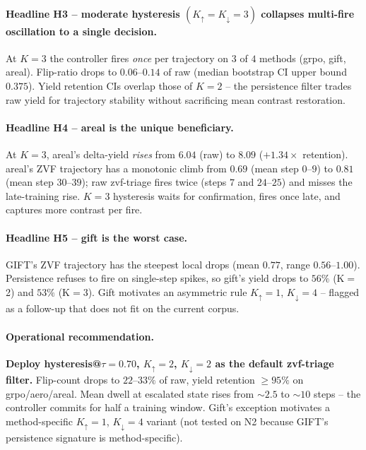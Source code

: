 \documentclass{article}
\begin{document}
\paragraph{Headline H3 -- moderate hysteresis
              $(K_{\uparrow}{=}K_{\downarrow}{=}3)$ collapses
              multi-fire oscillation to a single decision.}
At $K = 3$ the controller fires \emph{once} per trajectory on
$3$ of $4$ methods (grpo, gift, areal).  Flip-ratio drops to
$0.06$--$0.14$ of raw (median bootstrap CI upper bound $0.375$).
Yield retention CIs overlap those of $K = 2$ -- the persistence
filter trades raw yield for trajectory stability without
sacrificing mean contrast restoration.

\paragraph{Headline H4 -- areal is the unique beneficiary.}
At $K = 3$, areal's delta-yield \emph{rises} from $6.04$
(raw) to $8.09$ ($+1.34\times$ retention).  areal's ZVF
trajectory has a monotonic climb from $0.69$ (mean step $0$--$9$)
to $0.81$ (mean step $30$--$39$); raw zvf-triage fires twice
(steps $7$ and $24$--$25$) and misses the late-training rise.
$K = 3$ hysteresis waits for confirmation, fires once late,
and captures more contrast per fire.

\paragraph{Headline H5 -- gift is the worst case.}
GIFT's ZVF trajectory has the steepest local drops (mean $0.77$,
range $0.56$--$1.00$).  Persistence refuses to fire on
single-step spikes, so gift's yield drops to $56\%$ (K$=$2)
and $53\%$ (K$=$3).  Gift motivates an asymmetric rule
$K_{\uparrow}{=}1$, $K_{\downarrow}{=}4$ -- flagged as a
follow-up that does not fit on the current corpus.

\paragraph{Operational recommendation.}
\textbf{Deploy hysteresis@$\tau = 0.70$, $K_{\uparrow} = 2$,
$K_{\downarrow} = 2$ as the default zvf-triage filter.}
Flip-count drops to $22$--$33\%$ of raw, yield retention $\ge 95\%$
on grpo/aero/areal.  Mean dwell at escalated state rises from
$\sim 2.5$ to $\sim 10$ steps -- the controller commits for half
a training window.  Gift's exception motivates a method-specific
$K_{\uparrow} = 1$, $K_{\downarrow} = 4$ variant (not tested
on N2 because GIFT's persistence signature is method-specific).
\end{document}
